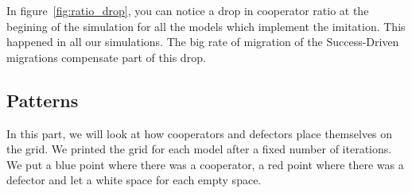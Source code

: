 \documentclass[11pt]{article}
\begin{document}
In figure~\ref{fig:ratio_drop}, you can notice a drop in cooperator ratio at the begining of the simulation for all the models which implement the imitation. This happened in all our simulations. The big rate of migration of the Success-Driven migrations compensate part of this drop.


\subsection{Patterns}

In this part, we will look at how cooperators and defectors place themselves on the grid. We printed the grid for each model after a fixed number of iterations. We put a blue point where there was a cooperator, a red point where there was a defector and let a white space for each empty space.
\end{document}
